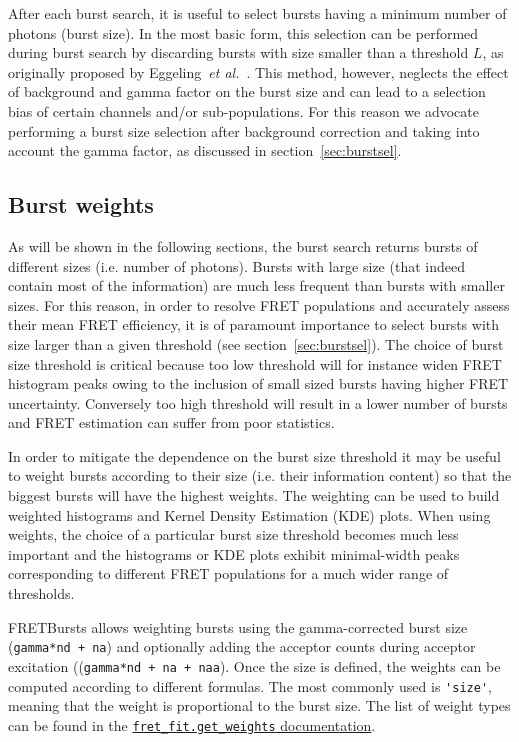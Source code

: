 After each burst search, it is useful to select
bursts having a minimum number of photons (burst size). In the most
basic form, this selection can be performed during burst search by discarding
bursts with size smaller than a threshold $L$, as originally proposed by
Eggeling~\textit{et al.}~\cite{Eggeling_1998}.
This method, however, neglects the effect
of background and gamma factor on the burst size and can lead to a selection
bias of certain channels and/or sub-populations.
For this reason we advocate performing a burst size selection after background
correction and taking into account the gamma factor, as discussed in
section~\ref{sec:burstsel}.


\subsection{Burst weights}

As will be shown in the following sections, the burst search returns bursts of different sizes (i.e. number of photons).
Bursts with large size (that indeed contain most of the information)
are much less frequent than bursts with smaller sizes. For this reason, in order
to resolve FRET populations and accurately assess their mean FRET efficiency, it is of
paramount importance to select bursts with size larger than a given threshold (see
section~\ref{sec:burstsel}). The choice of burst size threshold is
critical because too low threshold will for instance widen FRET histogram peaks owing to the
inclusion of small sized bursts having higher FRET uncertainty. Conversely
too high threshold will result in a lower number of bursts and FRET estimation
can suffer from poor statistics.

In order to mitigate the dependence on the burst size threshold it may be
useful to weight bursts according to their size (i.e. their
information content) so that the biggest bursts will have the highest weights.
The weighting can be used to build weighted histograms and Kernel Density Estimation (KDE) plots.
When using weights, the choice of a particular burst size threshold becomes
much less important and the histograms or KDE plots exhibit minimal-width
peaks corresponding to different FRET populations for a much wider range
of thresholds.

FRETBursts allows weighting bursts using the gamma-corrected burst size
(\verb|gamma*nd + na|) and optionally adding the acceptor counts during
acceptor excitation ((\verb|gamma*nd + na + naa|). Once the size is defined, the weights
can be computed according to different formulas. The most
commonly used is \verb|'size'|, meaning that the weight
is proportional to the burst size. The list of weight types
can be found in the
\href{http://fretbursts.readthedocs.org/en/latest/fret_fit.html#fretbursts.fret_fit.get_weights}{\texttt{fret\_fit.get\_weights} documentation}.

